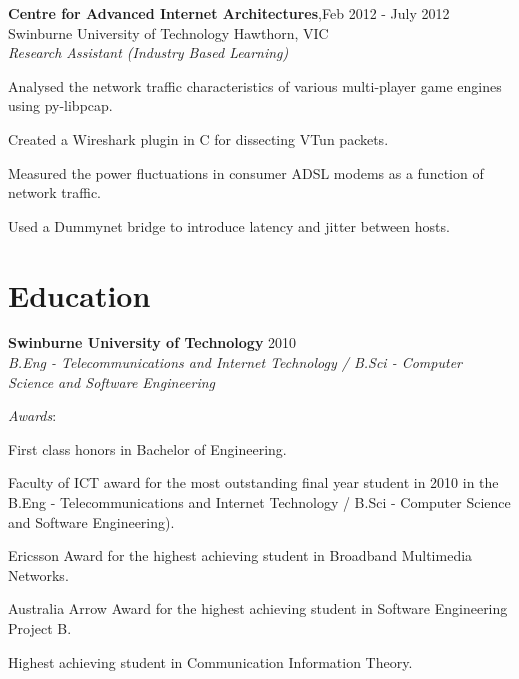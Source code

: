 \documentclass[line,margin]{res}
\begin{document}
\begin{resume}
        \textbf{Centre for Advanced Internet Architectures},\hfill Feb 2012 - July 2012 \\
        Swinburne University of Technology Hawthorn, VIC \\
        \textit{Research Assistant (Industry Based Learning)}\\
        
        \begin{list}{}{\leftmargin=1em \itemsep=-2pt}
            \item{Analysed the network traffic characteristics of various multi-player game engines using
            py-libpcap.}
            \item{Created a Wireshark plugin in C for dissecting VTun packets.}
            \item{Measured the power fluctuations in consumer ADSL modems as a function of network traffic.}
            \item{Used a Dummynet bridge to introduce latency and jitter between hosts.}
        \end{list}

        \section{Education}
        \textbf{Swinburne University of Technology} \hfill 2010\\
        \textit{B.Eng - Telecommunications and Internet Technology / B.Sci - Computer Science and
        Software Engineering}

        \textit{Awards}:
        \begin{list}{}{\leftmargin=1em \itemsep=-2pt}
            \item{First class honors in Bachelor of Engineering.}
            \item{Faculty of ICT award for the most outstanding final year student in 2010 in the B.Eng -
            Telecommunications and Internet Technology / B.Sci - Computer Science and Software
            Engineering).}
            \item{Ericsson Award for the highest achieving student in Broadband Multimedia Networks.}
            \item{Australia Arrow Award for the highest achieving student in Software Engineering Project B.}
            \item{Highest achieving student in Communication Information Theory.}
        \end{list}


\end{resume}
\end{document}
